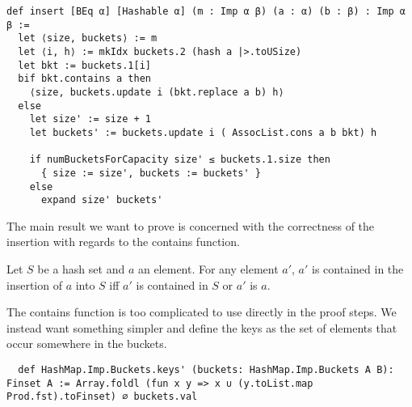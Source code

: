 \begin{lstlisting}
def insert [BEq α] [Hashable α] (m : Imp α β) (a : α) (b : β) : Imp α β :=
  let ⟨size, buckets⟩ := m
  let ⟨i, h⟩ := mkIdx buckets.2 (hash a |>.toUSize)
  let bkt := buckets.1[i]
  bif bkt.contains a then
    ⟨size, buckets.update i (bkt.replace a b) h⟩
  else
    let size' := size + 1
    let buckets' := buckets.update i ( AssocList.cons a b bkt) h

    if numBucketsForCapacity size' ≤ buckets.1.size then
      { size := size', buckets := buckets' }
    else
      expand size' buckets'
\end{lstlisting}

The main result we want to prove is concerned with the correctness of the insertion with regards to the contains function.

\begin{lemma}[\StdHashSetcontainsinsert]
  Let $S$ be a hash set and $a$ an element. For any element $a'$, $a'$ is contained in the insertion of $a$ into $S$ iff $a'$ is contained in $S$ or $a'$ is $a$.
\end{lemma}

The contains function is too complicated to use directly in the proof steps. We instead want something simpler and define the keys as the set of elements that occur somewhere in the buckets.

\begin{lstlisting}
  def HashMap.Imp.Buckets.keys' (buckets: HashMap.Imp.Buckets A B): Finset A := Array.foldl (fun x y => x ∪ (y.toList.map Prod.fst).toFinset) ∅ buckets.val
\end{lstlisting}
